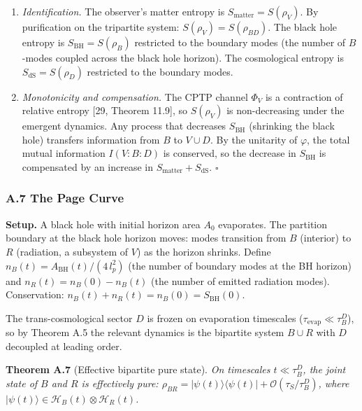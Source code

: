 \documentclass[
]{article}
\begin{document}
\begin{enumerate}
\def\labelenumi{(\roman{enumi})}
\setcounter{enumi}{1}
\item
  \emph{Identification.} The observer's matter entropy is
  \(S_{\text{matter}} = S(\rho_V)\). By purification on the tripartite
  system: \(S(\rho_V) = S(\rho_{BD})\). The black hole entropy is
  \(S_{\text{BH}} = S(\rho_B)\) restricted to the boundary modes (the
  number of \(B\)-modes coupled across the black hole horizon). The
  cosmological entropy is \(S_{\text{dS}} = S(\rho_D)\) restricted to
  the boundary modes.
\item
  \emph{Monotonicity and compensation.} The CPTP channel \(\Phi_V\) is a
  contraction of relative entropy {[}29, Theorem 11.9{]}, so
  \(S(\rho_V)\) is non-decreasing under the emergent dynamics. Any
  process that decreases \(S_{\text{BH}}\) (shrinking the black hole)
  transfers information from \(B\) to \(V \cup D\). By the unitarity of
  \(\varphi\), the total mutual information \(I(V:B:D)\) is conserved,
  so the decrease in \(S_{\text{BH}}\) is compensated by an increase in
  \(S_{\text{matter}} + S_{\text{dS}}\). \(\square\)
\end{enumerate}

\hypertarget{a.7-the-page-curve}{%
\subsubsection{A.7 The Page Curve}\label{a.7-the-page-curve}}

\textbf{Setup.} A black hole with initial horizon area \(A_0\)
evaporates. The partition boundary at the black hole horizon moves:
modes transition from \(B\) (interior) to \(R\) (radiation, a subsystem
of \(V\)) as the horizon shrinks. Define
\(n_B(t) = A_{\text{BH}}(t) / (4\,l_p^2)\) (the number of boundary modes
at the BH horizon) and \(n_R(t) = n_B(0) - n_B(t)\) (the number of
emitted radiation modes). Conservation:
\(n_B(t) + n_R(t) = n_B(0) = S_{\text{BH}}(0)\).

The trans-cosmological sector \(D\) is frozen on evaporation timescales
(\(\tau_{\text{evap}} \ll \tau_B^D\)), so by Theorem A.5 the relevant
dynamics is the bipartite system \(B \cup R\) with \(D\) decoupled at
leading order.

\textbf{Theorem A.7} (Effective bipartite pure state). \emph{On
timescales \(t \ll \tau_B^D\), the joint state of \(B\) and \(R\) is
effectively pure:
\(\rho_{BR} = |\psi(t)\rangle\langle\psi(t)| + \mathcal{O}(\tau_S / \tau_B^D)\),
where
\(|\psi(t)\rangle \in \mathcal{H}_B(t) \otimes \mathcal{H}_R(t)\).}
\end{document}
